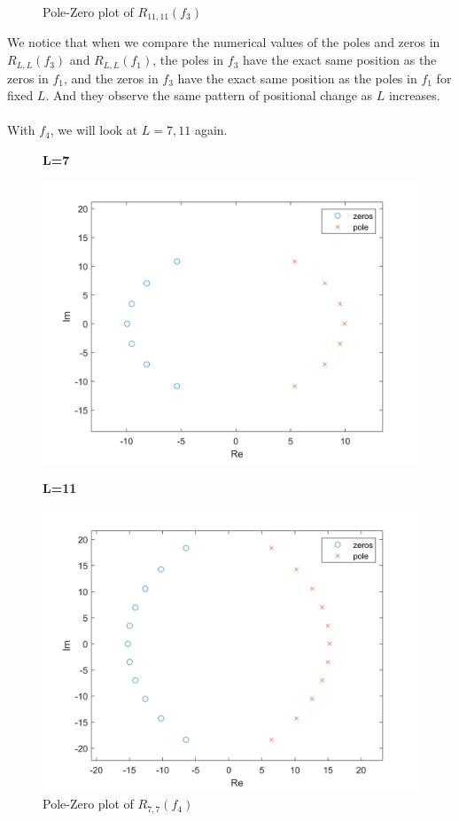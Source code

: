 \documentclass[10pt]{article}
\begin{document}
\begin{figure}[H]
\begin{minipage}[b]{0.47\linewidth}
    \caption{Pole-Zero plot of $R_{11,11}(f_3)$}
        \end{minipage}
\end{figure}
\noindent We notice that when we compare the numerical values of the poles and zeros in $R_{L,L}(f_3)$ and $R_{L,L}(f_1)$, the poles in $f_3$ have the exact same position as the zeros in $f_1$, and the zeros in $f_3$ have the exact same position as the poles in $f_1$ for fixed $L$. And they observe the same pattern of positional change as $L$ increases.\\\\
With $f_4$, we will look at $L=7,11$ again.\\
\begin{figure}[H]
    \begin{minipage}[b]{0.47\linewidth}
            \centering
            \textbf{L=7}\par
            \includegraphics[width=\textwidth]{Files/q5,f4,7.png}
            \caption{Pole-Zero plot of $R_{7,7}(f_4)$}
        \end{minipage}
        \hfill
            \begin{minipage}[b]{0.47\linewidth}
            \centering
    \textbf{L=11}\par
    \includegraphics[width=\textwidth]{Files/q5,f4,11.png}

\end{minipage}
\end{figure}
\end{document}
